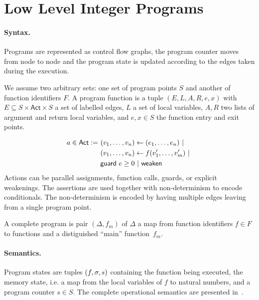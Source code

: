 \documentclass[nocopyrightspace,preprint]{sigplanconf-pldi15}
\newcommand{\pref}[1]{\prettyref{#1}}
\begin{document}
\section{Low Level Integer Programs}

\paragraph{Syntax.}
Programs are represented as control flow graphs, the program
counter moves from node to node and the program state is updated
according to the edges taken during the execution.

We assume two arbitrary sets: one set of program points $S$
and another of function identifiers $F$.
A program function is a tuple $(E, L, A, R, e, x)$ with
$E \subseteq S \times \mathsf{Act} \times S$ a set of labelled
edges, $L$ a set of local variables, $A, R$
two lists of argument and return local variables, and $e, x \in S$ the
function entry and exit points.

\begin{align*}
a \in \mathsf{Act} :=~&(v_1, \dots, v_n) \gets (e_1, \dots, e_n) ~|~\\
                      &(v_1, \dots, v_n) \gets f(v'_1, \dots, v'_m) ~|~\\
                      &\mathsf{guard}~e\ge 0 ~|~ \mathsf{weaken}
\end{align*}
Actions can be parallel assignments, function calls,
guards, or explicit weakenings.  The assertions are used
together with non-determinism to encode conditionals.  The
non-determinism is encoded by having multiple edges leaving
from a single program point.

A complete program is pair $(\Delta, f_m)$ of $\Delta$ a map from
function identifiers $f \in F$ to functions and a distiguished
``main'' function~$f_m$.

\paragraph{Semantics.}
Program states are tuples $(f, \sigma, s)$ containing the function
being executed, the memory state, i.e. a map from the local variables
of $f$ to natural numbers, and a program counter $s \in S$.  The
complete operational semantics are presented in~\pref{fig:sem}.
\end{document}

